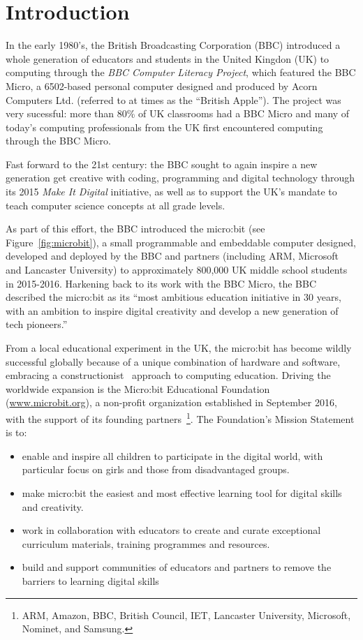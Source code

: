 \section{Introduction}
\label{sec:intrp}

In the early 1980's, the British Broadcasting Corporation (BBC)
introduced a whole generation of educators and students in the United Kingdon (UK) 
to computing through the {\em BBC Computer Literacy Project}, which featured the BBC Micro, 
a 6502-based personal computer designed and produced by Acorn Computers Ltd. (referred
to at times as the ``British Apple'').  The project was very sucessful:
more than 80\% of UK classrooms had a BBC Micro and many of today's 
computing professionals from the UK first encountered computing through
the BBC Micro.

Fast forward to the 21st century: the BBC sought to again inspire a new
generation get creative with coding, programming and digital technology
through its 2015 {\em Make It Digital} initiative, as well as to support the UK's mandate to 
teach computer science concepts at all grade levels.~\cite{PeytonJones2013ICFP}

As part of this effort, the BBC introduced the micro:bit (see 
Figure~\ref{fig:microbit}),
a small programmable and embeddable computer designed, 
developed and deployed by the BBC and partners (including ARM, Microsoft
and Lancaster University) to approximately 800,000 UK middle school students
in 2015-2016. Harkening back to its work with the BBC Micro,
the BBC described the micro:bit as its ``most ambitious education initiative in 30 years, 
with an ambition to inspire digital creativity and 
develop a new generation of tech pioneers.''~\cite{BBCwebsite}

From a local educational experiment in the UK, the micro:bit has become
wildly successful globally because of a unique combination of hardware and
software, embracing a constructionist~\cite{Papert} approach to computing education.
Driving the worldwide expansion is
the Micro:bit Educational Foundation (\url{www.microbit.org}),
a non-profit organization
established in September 2016, with the support of its founding partners~\footnote{ARM,
Amazon, BBC, British Council, IET, Lancaster University, Microsoft,
Nominet, and Samsung.}. 
The Foundation's Mission Statement is to: 
\begin{itemize}
\item  enable and inspire all children to participate in the digital world, 
with particular focus on girls and those from disadvantaged groups.
\item make micro:bit the easiest and most effective learning tool for digital skills and creativity.
\item work in collaboration with educators to create and curate exceptional 
curriculum materials, training programmes and resources.
\item build and support communities of educators and partners 
to remove the barriers to learning digital skills
\end{itemize}

